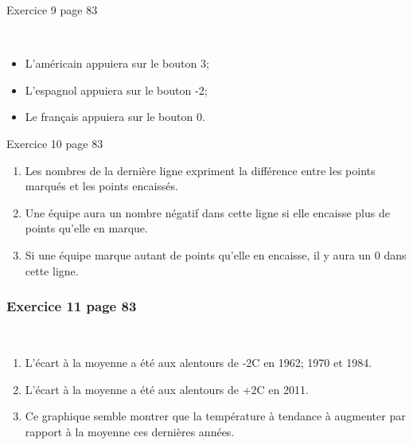 \documentclass[xcolor={dvipsnames}, handout]{beamer}
\begin{document}
\begin{frame}
	
	\begin{alertblock}{Exercice 9 page 83}
		
	\ \pause
	
	\begin{itemize}
		\item L'américain appuiera sur le bouton 3;\pause
		\item L'espagnol appuiera sur le bouton -2;\pause
		\item Le français appuiera sur le bouton 0.\pause
	\end{itemize}
	\end{alertblock}
%

	\begin{alertblock}{Exercice 10 page 83}
	 \ \pause	
	\begin{enumerate}
		\item Les nombres de la dernière ligne expriment la différence entre les points marqués et les points encaissés.\pause
		\item Une équipe aura un nombre négatif dans cette ligne si elle encaisse plus de points qu'elle en marque.\pause
		\item Si une équipe marque autant de points qu'elle en encaisse, il y aura un 0 dans cette ligne.%
	\end{enumerate}
	\end{alertblock}
\end{frame}

\begin{frame}
	\frametitle{Exercice 11 page 83}
	\ \pause
	\begin{enumerate}
		\item L'écart à la moyenne a été aux alentours de -2\degree C en 1962; 1970 et 1984.\pause
		\item L'écart à la moyenne a été aux alentours de +2\degree C en 2011.\pause
		\item Ce graphique semble montrer que la température à tendance à augmenter par rapport à la moyenne ces dernières années.\pause
		
	\end{enumerate}
\end{frame}
\end{document}
